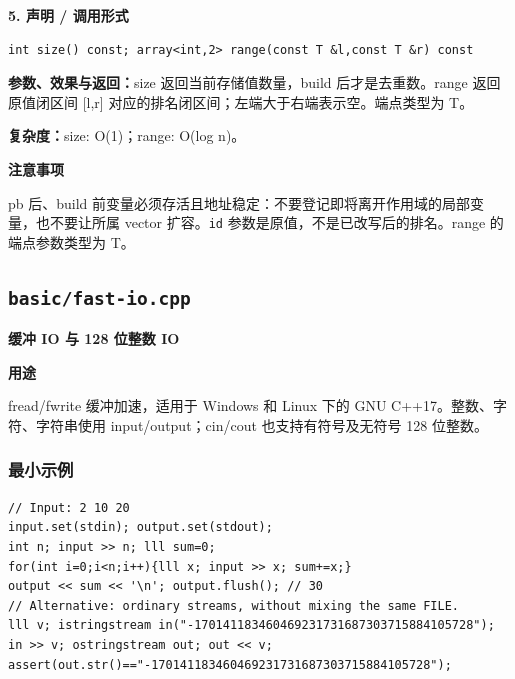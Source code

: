 \documentclass[UTF8,a4paper,10pt]{ctexart}
\newcommand{\TemplUsage}[1]{\textbf{用途}\par #1\par}
\newcommand{\TemplNote}[1]{\textbf{注意事项}\par #1\par}
\begin{document}
\noindent\begin{minipage}{\textwidth}
\textbf{5. 声明 / 调用形式}
\begin{lstlisting}
int size() const; array<int,2> range(const T &l,const T &r) const
\end{lstlisting}
\textbf{参数、效果与返回：}size 返回当前存储值数量，build 后才是去重数。range 返回原值闭区间 [l,r] 对应的排名闭区间；左端大于右端表示空。端点类型为 T。

\textbf{复杂度：}size: O(1)；range: O(log n)。

\TemplNote{pb 后、build 前变量必须存活且地址稳定：不要登记即将离开作用域的局部变量，也不要让所属 vector 扩容。\texttt{id} 参数是原值，不是已改写后的排名。range 的端点参数类型为 T。}
\end{minipage}\par\vspace{0.4em}
\clearpage
\subsection{\texttt{basic/fast-io.cpp}}
\textbf{缓冲 IO 与 128 位整数 IO}\par
\TemplUsage{fread/fwrite 缓冲加速，适用于 Windows 和 Linux 下的 GNU C++17。整数、字符、字符串使用 input/output；cin/cout 也支持有符号及无符号 128 位整数。}
\subsubsection*{最小示例}
\begin{lstlisting}
// Input: 2 10 20
input.set(stdin); output.set(stdout);
int n; input >> n; lll sum=0;
for(int i=0;i<n;i++){lll x; input >> x; sum+=x;}
output << sum << '\n'; output.flush(); // 30
// Alternative: ordinary streams, without mixing the same FILE.
lll v; istringstream in("-170141183460469231731687303715884105728");
in >> v; ostringstream out; out << v;
assert(out.str()=="-170141183460469231731687303715884105728");
\end{lstlisting}
\end{document}
